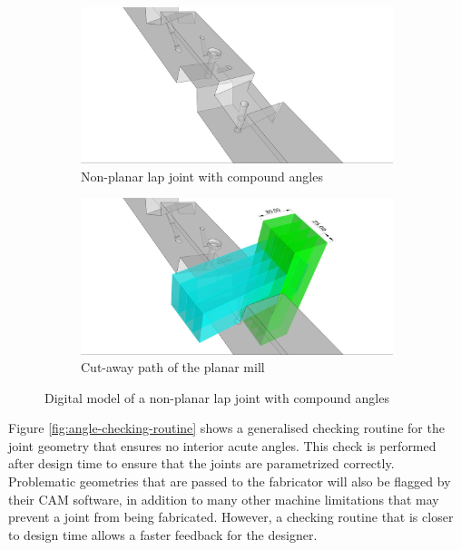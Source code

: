 \begin{figure}[!h]
    \centering
    \begin{subfigure}[b]{0.49\textwidth}
        \centering
        \includegraphics[width=\textwidth]{images/7a/img04.jpg}
        \caption{Non-planar lap joint with compound angles}
        \label{fig:non-planar-lap-joint-with-compound-angles}
    \end{subfigure}
    \hfill
    \begin{subfigure}[b]{0.49\textwidth}
        \centering
        \includegraphics[width=\textwidth]{images/7a/img05.jpg}
        \caption{Cut-away path of the planar mill}
        \label{fig:cut-away-path-of-the-planar-mill}
    \end{subfigure}
    \caption{Digital model of a non-planar lap joint with compound angles}
    \label{fig:model-non-planar-lap-joint}
\end{figure}


Figure \ref{fig:angle-checking-routine} shows a generalised checking routine for the joint geometry that ensures no interior acute angles. This check is performed after design time to ensure that the joints are parametrized correctly. Problematic geometries that are passed to the fabricator will also be flagged by their CAM software, in addition to many other machine limitations that may prevent a joint from being fabricated. However, a checking routine that is closer to design time allows a faster feedback for the designer.


